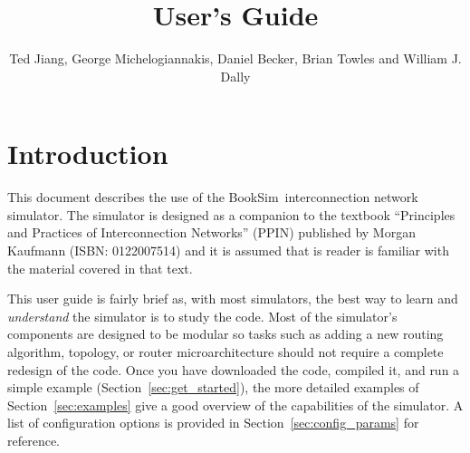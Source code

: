 \documentclass[11pt]{article}
\author{Ted Jiang, George Michelogiannakis, Daniel Becker, Brian Towles and William J. Dally}
\title{\simname 2.0 User's Guide}
\newcommand{\simname}{BookSim~}
\begin{document}
\maketitle
\tableofcontents

\pagestyle{fancy}
\renewcommand{\sectionmark}[1]{\markright{\thesection\ #1}}
\fancyhf{} %
\fancyhead[LE,RO]{\bfseries\thepage}
\fancyhead[LO]{\bfseries\rightmark}
\fancyhead[RE]{\bfseries\leftmark}
\renewcommand{\headrulewidth}{0.5pt}
\renewcommand{\footrulewidth}{0.5pt}
\addtolength{\headheight}{0.5pt} %
\cfoot{\small\today}
\fancypagestyle{plain}{%
    \fancyhf{} %
    \renewcommand{\headrulewidth}{0pt} %
    \renewcommand{\footrulewidth}{0pt} %
} 



\newenvironment{opt_list}[1]{\begin{list}{}{\renewcommand{\makelabel}[1]%
{\texttt{##1}\hfil}\settowidth{\labelwidth}{\texttt{#1}}\setlength{\leftmargin}%
{\labelwidth+\labelsep}}}{\end{list}}

\section{Introduction}

This document describes the use of the \simname interconnection
network simulator.  The simulator is designed as a companion to the
textbook ``Principles and Practices of Interconnection Networks''
(PPIN) published by Morgan Kaufmann (ISBN: 0122007514) and it is
assumed that is reader is familiar with the material covered in that
text.

This user guide is fairly brief as, with most simulators, the best way
to learn and {\it understand} the simulator is to study the code.
Most of the simulator's components are designed to be modular so tasks
such as adding a new routing algorithm, topology, or router
microarchitecture should not require a complete redesign of the code.
Once you have downloaded the code, compiled it, and run a simple
example (Section~\ref{sec:get_started}), the more detailed examples of
Section~\ref{sec:examples} give a good overview of the capabilities of
the simulator.  A list of configuration options is provided in
Section~\ref{sec:config_params} for reference.
\end{document}

